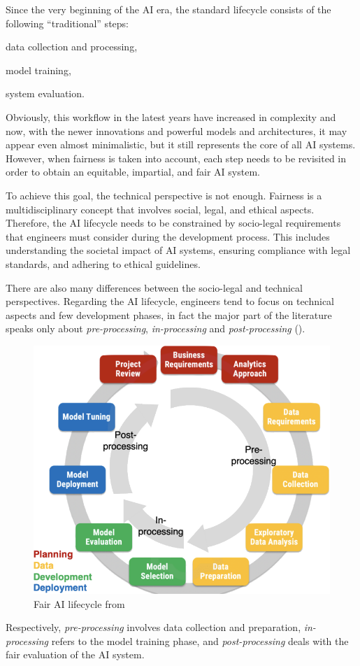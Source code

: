 \documentclass[12pt,a4paper,openright,twoside]{book}
\begin{document}
Since the very beginning of the \ac{AI} era, the standard lifecycle consists of the following ``traditional'' steps:
\begin{enumerate*}[label= (\roman*)]
    \item data collection and processing,
    \item model training,
    \item system evaluation.
\end{enumerate*}
%
Obviously, this workflow in the latest years have increased in complexity and now, with the newer innovations and powerful models and architectures, it may appear even almost minimalistic, but it still represents the core of all \ac{AI} systems.
%
However, when fairness is taken into account, each step needs to be revisited in order to obtain an equitable, impartial, and fair \ac{AI} system.

To achieve this goal, the technical perspective is not enough.
%
Fairness is a multidisciplinary concept that involves social, legal, and ethical aspects.
%
Therefore, the \ac{AI} lifecycle needs to be constrained by socio-legal requirements that engineers must consider during the development process.
%
This includes understanding the societal impact of \ac{AI} systems, ensuring compliance with legal standards, and adhering to ethical guidelines.

There are also many differences between the socio-legal and technical perspectives.
%
Regarding the \ac{AI} lifecycle, engineers tend to focus on technical aspects and few development phases, in fact the major part of the literature speaks only about \textit{pre-processing}, \textit{in-processing} and \textit{post-processing} ().
%
\begin{figure}
    \centering
    \includegraphics[width=.6\linewidth]{figures/ai-lifecycle.png}
    \caption{Fair \acs{AI} lifecycle from~\cite{DBLP:conf/ijcai/CalegariCMO23}}
    \label{fig:ai-lifecycle}
\end{figure}
%
Respectively, \textit{pre-processing} involves data collection and preparation, \textit{in-processing} refers to the model training phase, and \textit{post-processing} deals with the fair evaluation of the \ac{AI} system.
\end{document}
